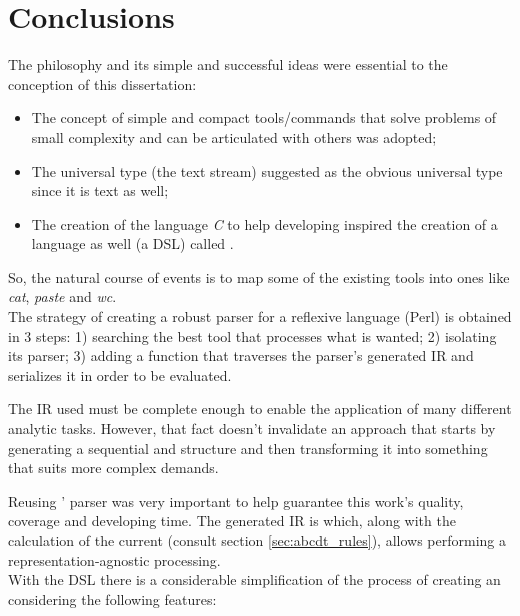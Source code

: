 %

\section{Conclusions}

The \unix{} philosophy and its simple and successful ideas were essential to the conception of this
dissertation:

\begin{itemize}
  \item The concept of simple and compact tools/commands that solve problems of small complexity and
  can be articulated with others was adopted;
  \item The universal type (the text stream) suggested \abc{} as the obvious universal type since it
  is text as well;
  \item The creation of the language \emph{C} to help developing \unix{} inspired the creation of a
  language as well (a \ac{DSL}) called \abcdt{}.
\end{itemize}

So, the natural course of events is to map some of the existing \unix{} tools into \abc{} ones like
\emph{cat}, \emph{paste} and \emph{wc}.\\


The strategy of creating a robust parser for a reflexive language (Perl) is obtained in 3 steps: 1)
searching the best tool that processes what is wanted; 2) isolating its parser; 3) adding a function
that traverses the parser's generated \ac{IR} and serializes it in order to be evaluated.

The \ac{IR} used must be complete enough to enable the application of many different analytic tasks.
However, that fact doesn't invalidate an approach that starts by generating a sequential and
\sourcewise{} structure and then transforming it into something that suits more complex demands.

Reusing \abcmtops{}' parser was very important to help guarantee this work's quality, coverage and
developing time. The generated \ac{IR} is \sourcewise{} which, along with the calculation of the
current \context{} (consult section \ref{sec:abcdt_rules}), allows performing a
representation-agnostic processing.\\


With the \ac{DSL} \abcdt{} there is a considerable simplification of the process of creating an
\abcpt{} considering the following features:

